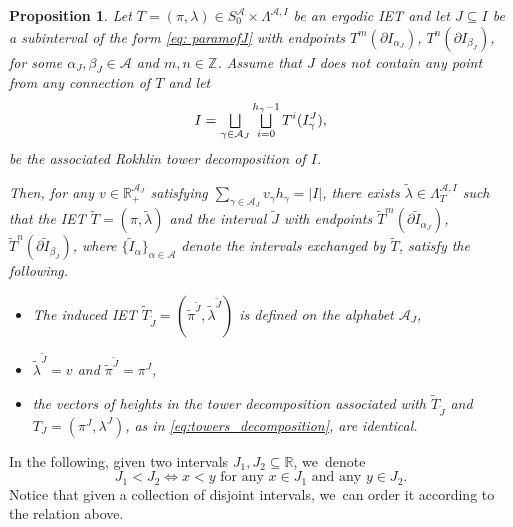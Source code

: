 \documentclass[10pt,a4paper]{amsart}
\let\oldbigsqcup\bigsqcup
\renewcommand{\bigsqcup}{\mathop{\textstyle\oldbigsqcup}\displaylimits}
\theoremstyle{plain}
\newtheorem{proposition}[theorem]{Proposition}
\theoremstyle{definition}
\newcommand{\A}{\mathcal{A}}
\newcommand{\Z}{\mathbb{Z}}
\newcommand{\R}{\mathbb{R}}
\begin{document}
\begin{proposition}
\label{prop: unwinding}
Let $T = (\pi, \lambda) \in S_0^\A \times \Lambda^{\A, I}$ be an ergodic IET and let $J \subseteq I$ be a subinterval of the form \eqref{eq: paramofJ} with endpoints $T^{m}(\partial I_{\alpha_J})$, $T^n(\partial I_{\beta_J})$, for some $\alpha_J, \beta_J \in \A$ and $m, n \in \Z$. Assume that $J$ does not contain any point from any connection of $T$ and let
\begin{equation}
\label{eq:initial_towers}
I = \bigsqcup_{\gamma \in \A_J} \bigsqcup_{i = 0}^{h_\gamma - 1} T^i(I_\gamma^J),
\end{equation}
be the associated Rokhlin tower decomposition of $I$.

Then, for any $v \in \R^{\A_J}_+$ satisfying $\sum_{\gamma \in \A_J} v_\gamma h_\gamma = |I|$, there exists $\tilde \lambda \in \Lambda^{\A, I}_T$ such that the IET $\tilde T = (\pi, \tilde \lambda)$ and the interval $\tilde J$ with endpoints $\tilde T^{m}(\partial \tilde I_{\alpha_J})$, $\tilde T^n(\partial \tilde I_{\beta_J})$, where $\{\tilde I_\alpha\}_{\alpha \in \A}$ denote the intervals exchanged by $\tilde T$, satisfy the following.
\begin{itemize}
\item The induced IET $\tilde T_{\tilde J}= (\tilde \pi ^{\tilde J}, \tilde \lambda ^{\tilde J})$ is defined on the alphabet $\A_J$,
\item $\tilde \lambda^{\tilde J} = v$ and $\tilde \pi^{\tilde J} = \pi^J$,
\item {the vectors of heights in the tower decomposition associated with $\tilde T_{\tilde J}$ and $T_J = (\pi^J, \lambda^J)$, as in \eqref{eq:towers_decomposition}, are identical.}
\end{itemize}
\end{proposition}

In the following, given two intervals $J_1, J_2 \subseteq \R$, we~denote
\begin{equation}\label{eq: defofintervalorder}
J_1<J_2\iff x<y \text{ for any }x\in J_1\text{ and any }y\in J_2.
\end{equation}
Notice that given a collection of disjoint intervals, we~can order it according to the relation above.
\end{document}
